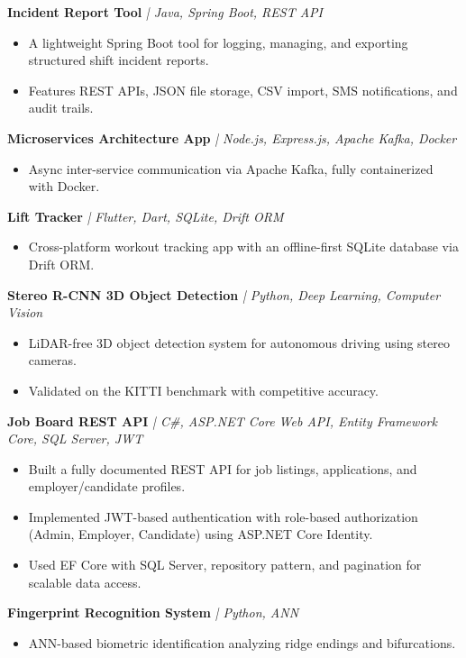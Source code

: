 \documentclass[10pt, letterpaper]{article}
\newcommand{\cvproject}[2]{%
  \textbf{#1} \textit{| #2}%
}
\begin{document}
\cvproject{Incident Report Tool}{Java, Spring Boot, REST API}
\begin{itemize}
  \item A lightweight Spring Boot tool for logging, managing, and exporting structured shift incident reports.
  \item Features REST APIs, JSON file storage, CSV import, SMS notifications, and audit trails.
\end{itemize}

\cvproject{Microservices Architecture App}{Node.js, Express.js, Apache Kafka, Docker}
\begin{itemize}
  \item Async inter-service communication via Apache Kafka, fully containerized with Docker.
\end{itemize}

\cvproject{Lift Tracker}{Flutter, Dart, SQLite, Drift ORM}
\begin{itemize}
  \item Cross-platform workout tracking app with an offline-first SQLite database via Drift ORM.
\end{itemize}

\cvproject{Stereo R-CNN 3D Object Detection}{Python, Deep Learning, Computer Vision}
\begin{itemize}
  \item LiDAR-free 3D object detection system for autonomous driving using stereo cameras.
  \item Validated on the KITTI benchmark with competitive accuracy.
\end{itemize}

\cvproject{Job Board REST API}{C\#, ASP.NET Core Web API, Entity Framework Core, SQL Server, JWT}
\begin{itemize}
  \item Built a fully documented REST API for job listings, applications, and employer/candidate profiles.
  \item Implemented JWT-based authentication with role-based authorization (Admin, Employer, Candidate) using ASP.NET Core Identity.
  \item Used EF Core with SQL Server, repository pattern, and pagination for scalable data access.
\end{itemize}

\cvproject{Fingerprint Recognition System}{Python, ANN}
\begin{itemize}
  \item ANN-based biometric identification analyzing ridge endings and bifurcations.
\end{itemize}
\end{document}
